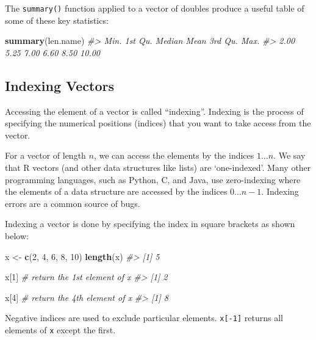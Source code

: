 \documentclass[]{book}
\newenvironment{Shaded}{\begin{snugshade}}{\end{snugshade}}
\newcommand{\CommentTok}[1]{\textcolor[rgb]{0.56,0.35,0.01}{\textit{#1}}}
\newcommand{\DecValTok}[1]{\textcolor[rgb]{0.00,0.00,0.81}{#1}}
\newcommand{\KeywordTok}[1]{\textcolor[rgb]{0.13,0.29,0.53}{\textbf{#1}}}
\newcommand{\NormalTok}[1]{#1}
\newcommand{\StringTok}[1]{\textcolor[rgb]{0.31,0.60,0.02}{#1}}
\theoremstyle{definition}
\theoremstyle{definition}
\theoremstyle{definition}
\theoremstyle{remark}
\begin{document}
The \texttt{summary()} function applied to a vector of doubles produce a
useful table of some of these key statistics:

\begin{Shaded}
\begin{Highlighting}[]
\KeywordTok{summary}\NormalTok{(len.name)}
\CommentTok{#>    Min. 1st Qu.  Median    Mean 3rd Qu.    Max. }
\CommentTok{#>    2.00    5.25    7.00    6.60    8.50   10.00}
\end{Highlighting}
\end{Shaded}

\hypertarget{indexing-vectors}{%
\subsection{Indexing Vectors}\label{indexing-vectors}}

Accessing the element of a vector is called ``indexing''. Indexing is
the process of specifying the numerical positions (indices) that you
want to take access from the vector.

For a vector of length \(n\), we can access the elements by the indices
\(1 \ldots n\). We say that R vectors (and other data structures like
lists) are `one-indexed'. Many other programming languages, such as
Python, C, and Java, use zero-indexing where the elements of a data
structure are accessed by the indices \(0 \ldots n-1\). Indexing errors
are a common source of bugs.

Indexing a vector is done by specifying the index in square brackets as
shown below:

\begin{Shaded}
\begin{Highlighting}[]
\NormalTok{x <-}\StringTok{ }\KeywordTok{c}\NormalTok{(}\DecValTok{2}\NormalTok{, }\DecValTok{4}\NormalTok{, }\DecValTok{6}\NormalTok{, }\DecValTok{8}\NormalTok{, }\DecValTok{10}\NormalTok{)}
\KeywordTok{length}\NormalTok{(x)}
\CommentTok{#> [1] 5}

\NormalTok{x[}\DecValTok{1}\NormalTok{]  }\CommentTok{# return the 1st element of x}
\CommentTok{#> [1] 2}

\NormalTok{x[}\DecValTok{4}\NormalTok{]  }\CommentTok{# return the 4th element of x}
\CommentTok{#> [1] 8}
\end{Highlighting}
\end{Shaded}

Negative indices are used to exclude particular elements.
\texttt{x{[}-1{]}} returns all elements of \texttt{x} except the first.
\end{document}
